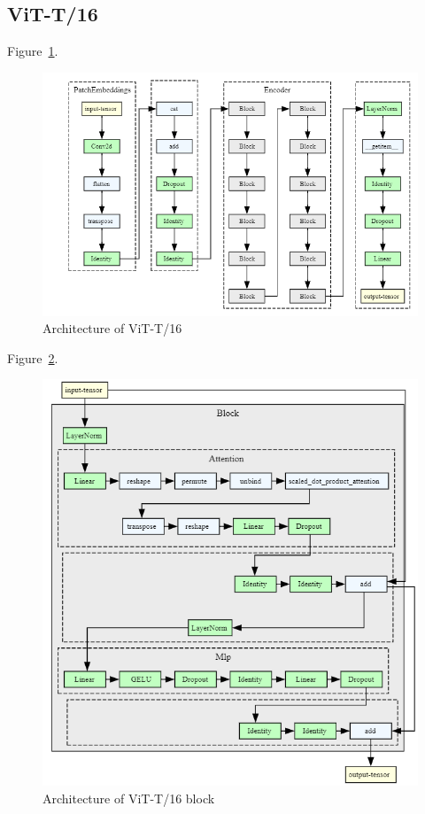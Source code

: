 \subsection{ViT-T/16}
Figure~\ref{fig:vit_t16_architecture}.

\begin{figure}[H]
    \begin{center}
    \includegraphics[width=15cm]{../images/vit_t16_architecture.png}
    \caption{Architecture of ViT-T/16}
   \label{fig:vit_t16_architecture}
    \end{center}
\end{figure}

Figure~\ref{fig:vit_t16_architecture_block}.

\begin{figure}[H]
    \begin{center}
    \includegraphics[width=15cm]{../images/vit_t16_architecture_block.png}
    \caption{Architecture of ViT-T/16 block}
   \label{fig:vit_t16_architecture_block}
    \end{center}
\end{figure}

